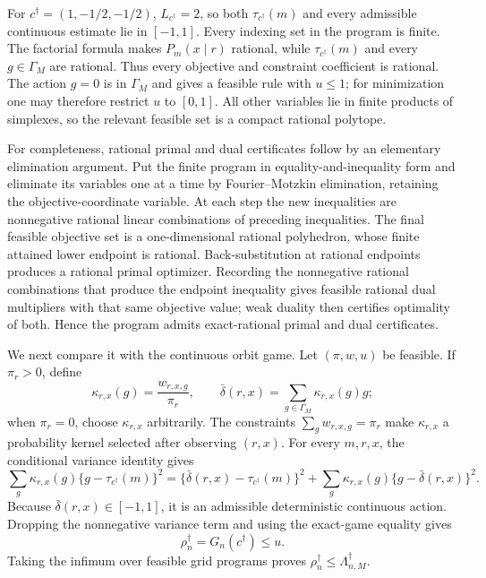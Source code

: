 For \(c^\dagger=(1,-1/2,-1/2)\), \(L_{c^\dagger}=2\), so both \(\tau_{c^\dagger}(m)\) and every admissible continuous estimate lie in \([-1,1]\).  Every indexing set in the program is finite.  The factorial formula makes \(P_m(x\mid r)\) rational, while \(\tau_{c^\dagger}(m)\) and every \(g\in\Gamma_M\) are rational.  Thus every objective and constraint coefficient is rational.  The action \(g=0\) is in \(\Gamma_M\) and gives a feasible rule with \(u\le1\); for minimization one may therefore restrict \(u\) to \([0,1]\).  All other variables lie in finite products of simplexes, so the relevant feasible set is a compact rational polytope.

For completeness, rational primal and dual certificates follow by an elementary elimination argument.  Put the finite program in equality-and-inequality form and eliminate its variables one at a time by Fourier--Motzkin elimination, retaining the objective-coordinate variable.  At each step the new inequalities are nonnegative rational linear combinations of preceding inequalities.  The final feasible objective set is a one-dimensional rational polyhedron, whose finite attained lower endpoint is rational.  Back-substitution at rational endpoints produces a rational primal optimizer.  Recording the nonnegative rational combinations that produce the endpoint inequality gives feasible rational dual multipliers with that same objective value; weak duality then certifies optimality of both.  Hence the program admits exact-rational primal and dual certificates.

We next compare it with the continuous orbit game.  Let \((\pi,w,u)\) be feasible.  If \(\pi_r>0\), define
\[
 \kappa_{r,x}(g)=\frac{w_{r,x,g}}{\pi_r},
 \qquad
 \bar\delta(r,x)=\sum_{g\in\Gamma_M}\kappa_{r,x}(g)g;
\]
when \(\pi_r=0\), choose \(\kappa_{r,x}\) arbitrarily.  The constraints
\(\sum_gw_{r,x,g}=\pi_r\) make \(\kappa_{r,x}\) a probability kernel selected after observing \((r,x)\).  For every \(m,r,x\), the conditional variance identity gives
\[
 \sum_g\kappa_{r,x}(g)\{g-\tau_{c^\dagger}(m)\}^2
 =\{\bar\delta(r,x)-\tau_{c^\dagger}(m)\}^2
 +\sum_g\kappa_{r,x}(g)\{g-\bar\delta(r,x)\}^2.
\]
Because \(\bar\delta(r,x)\in[-1,1]\), it is an admissible deterministic continuous action.  Dropping the nonnegative variance term and using the exact-game equality gives
\[
 \rho_n^\dagger=G_n(c^\dagger)\le u.
\]
Taking the infimum over feasible grid programs proves
\(\rho_n^\dagger\le\Lambda_{n,M}^\dagger\).


